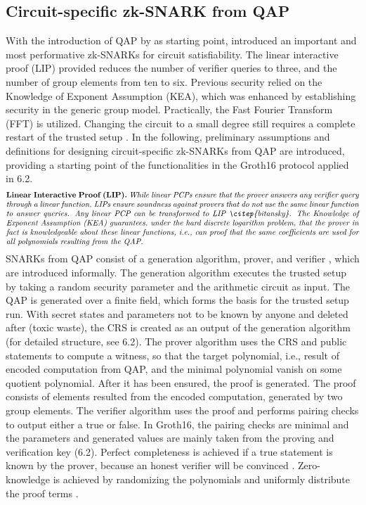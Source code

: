 \subsection{Circuit-specific zk-SNARK from QAP}
With the introduction of QAP by \citet{GennaroLinPCP} as starting point, \citet{Groth2016OnTS} introduced an important and most performative zk-SNARKs for circuit satisfiability. The linear interactive proof (LIP) provided reduces the number of verifier queries to three, and the number of group elements from ten to six. Previous security relied on the Knowledge of Exponent Assumption (KEA), which was enhanced by establishing security in the generic group model. Practically, the Fast Fourier Transform (FFT) is utilized. Changing the circuit to a small degree still requires a complete restart of the trusted setup \citep{Thaler}. In the following, preliminary assumptions and definitions for designing circuit-specific zk-SNARKs from QAP are introduced, providing a starting point of the functionalities in the Groth16 protocol applied in 6.2.
\begin{align*}
    \text{\parbox{450pt}{\textbf{Linear Interactive Proof (LIP).} \textit{While linear PCPs ensure that the prover answers any verifier query through a linear function, LIPs ensure soundness against provers that do not use the same linear function to answer queries. Any linear PCP can be transformed to LIP \citep{bitansky}. The Knowledge of Exponent Assumption (KEA) guarantees, under the hard discrete logarithm problem, that the prover in fact is knowledgeable about these linear functions, i.e., can proof that the same coefficients are used for all polynomials resulting from the QAP.}}}
\end{align*}
SNARKs from QAP consist of a generation algorithm, prover, and verifier \citep{Groth2016OnTS, Guo, Benamara}, which are introduced informally.
The generation algorithm executes the trusted setup by taking a random security parameter and the arithmetic circuit as input. The QAP is generated over a finite field, which forms the basis for the trusted setup run. With secret states and parameters not to be known by anyone and deleted after (toxic waste), the CRS is created as an output of the generation algorithm (for detailed structure, see 6.2). The prover algorithm uses the CRS and public statements to compute a witness, so that the target polynomial, i.e., result of encoded computation from QAP, and the minimal polynomial vanish on some quotient polynomial. After it has been ensured, the proof is generated. The proof consists of elements resulted from the encoded computation, generated by two group elements. The verifier algorithm uses the proof and performs pairing checks to output either a true or false. In Groth16, the pairing checks are minimal and the parameters and generated values are mainly taken from the proving and verification key (6.2). Perfect completeness is achieved if a true statement is known by the prover, because an honest verifier will be convinced \citep{Guo}. Zero-knowledge is achieved by randomizing the polynomials and uniformly distribute the proof terms \citep{Groth2016OnTS, Groth2010ShortPN}.

